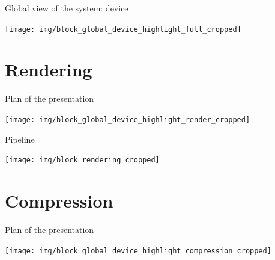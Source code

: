 \documentclass[10pt, notes]{beamer}
\begin{document}

\begin{frame}{Global view of the system: device}
    \begin{center}
        \texttt{[image: img/block\_global\_device\_highlight\_full\_cropped]}
    \end{center}
\end{frame}

\section{Rendering}
\begin{frame}{Plan of the presentation}
    \begin{center}
        \texttt{[image: img/block\_global\_device\_highlight\_render\_cropped]}
    \end{center}
\end{frame}

\begin{frame}{Pipeline}
    \begin{center}
        \texttt{[image: img/block\_rendering\_cropped]}
    \end{center}
\end{frame}

\section{Compression}
\begin{frame}{Plan of the presentation}
    \begin{center}
        \texttt{[image: img/block\_global\_device\_highlight\_compression\_cropped]}
    \end{center}
\end{frame}
\end{document}
